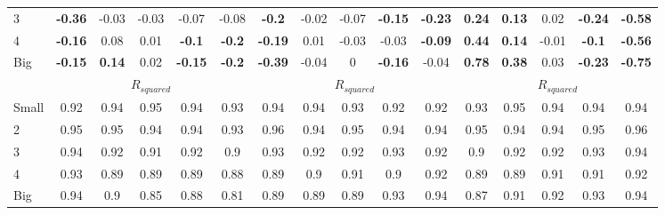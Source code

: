 \begin{table}[H]
\begin{tabular}{lccccc|ccccc|ccccc}
3 & \textbf{-0.36} & -0.03 & -0.03 & -0.07 & -0.08 & \textbf{-0.2} & -0.02 & -0.07 & \textbf{-0.15} & \textbf{-0.23} & \textbf{0.24} & \textbf{0.13} & 0.02 & \textbf{-0.24} & \textbf{-0.58} \\
4 & \textbf{-0.16} & 0.08 & 0.01 & \textbf{-0.1} & \textbf{-0.2} & \textbf{-0.19} & 0.01 & -0.03 & -0.03 & \textbf{-0.09} & \textbf{0.44} & \textbf{0.14} & -0.01 & \textbf{-0.1} & \textbf{-0.56} \\
Big & \textbf{-0.15} & \textbf{0.14} & 0.02 & \textbf{-0.15} & \textbf{-0.2} & \textbf{-0.39} & -0.04 & 0 & \textbf{-0.16} & -0.04 & \textbf{0.78} & \textbf{0.38} & 0.03 & \textbf{-0.23} & \textbf{-0.75} \\
 & \multicolumn{5}{c|}{$R_{squared}$} & \multicolumn{5}{c|}{$R_{squared}$} & \multicolumn{5}{c}{$R_{squared}$} \\
Small & 0.92 & 0.94 & 0.95 & 0.94 & 0.93 & 0.94 & 0.94 & 0.93 & 0.92 & 0.92 & 0.93 & 0.95 & 0.94 & 0.94 & 0.94 \\
2 & 0.95 & 0.95 & 0.94 & 0.94 & 0.93 & 0.96 & 0.94 & 0.95 & 0.94 & 0.94 & 0.95 & 0.94 & 0.94 & 0.95 & 0.96 \\
3 & 0.94 & 0.92 & 0.91 & 0.92 & 0.9 & 0.93 & 0.92 & 0.92 & 0.93 & 0.92 & 0.9 & 0.92 & 0.92 & 0.93 & 0.94 \\
4 & 0.93 & 0.89 & 0.89 & 0.89 & 0.88 & 0.89 & 0.9 & 0.91 & 0.9 & 0.92 & 0.89 & 0.89 & 0.91 & 0.91 & 0.92 \\
Big & 0.94 & 0.9 & 0.85 & 0.88 & 0.81 & 0.89 & 0.89 & 0.89 & 0.93 & 0.94 & 0.87 & 0.91 & 0.92 & 0.93 & 0.94 \\
\end{tabular}
\end{table}
